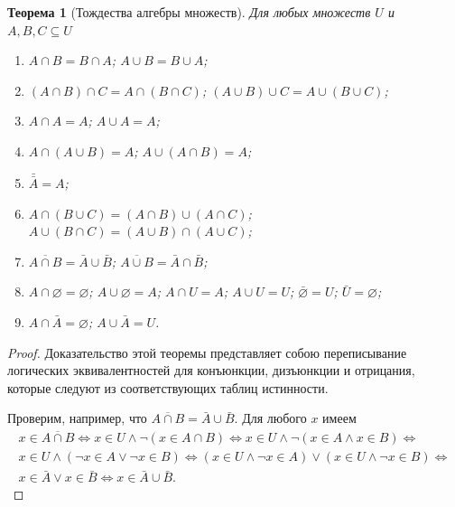 \documentclass[12pt,notitlepage]{article}
\theoremstyle{plain}
\newtheorem{thm}{Теорема}[section]
\theoremstyle{definition}
\theoremstyle{plain}
\newcommand{\sbs}{\subseteq}
\newcommand{\void}{\varnothing}
\newcommand{\1}{\mathbf{1}}
\newcommand{\0}{\mathbf{0}}
\begin{document}
\begin{thm}[Тождества алгебры множеств]\label{ch0:boolean} Для любых множеств $U$ и $A, B, C \sbs U$
	\begin{enumerate}
		\item $A \cap B = B \cap A$; $A \cup B = B \cup A$;
		\item $(A \cap B) \cap C = A \cap (B \cap C)$; $(A \cup B) \cup C = A \cup (B \cup C)$;
		\item $A \cap A = A$; $A \cup A = A$;
		\item $A \cap (A \cup B) = A$; $A \cup (A \cap B) = A$;
		\item $\bar{\bar A} = A$;
		\item $A \cap (B \cup C) = (A \cap B) \cup (A \cap C)$; $A \cup (B \cap C) = (A \cup B) \cap (A \cup C)$;
		\item $\overline{A \cap B} = \bar A \cup \bar B$; $\overline{A \cup B} = \bar A \cap \bar B$;
		\item $A \cap \void = \void$; $A \cup \void = A$; $A \cap U = A$; $A \cup U = U$; $\bar \void = U$; $\bar U = \void$;
		\item $A \cap \bar A = \void$; $A \cup \bar A = U$.
	\end{enumerate}
\end{thm}
\begin{proof}
	Доказательство этой теоремы представляет собою переписывание логических эквивалентностей для конъюнкции, дизъюнкции и отрицания, которые следуют из соответствующих таблиц истинности.
	
	Проверим, например, что $\overline{A \cap B} = \bar A \cup \bar B$. Для любого $x$ имеем
	\begin{multline*}
		x \in \overline{A \cap B} \iff x \in U \wedge \neg (x \in A \cap B) \iff x \in U \wedge \neg (x \in A \wedge x \in B) \iff\\
		x \in U \wedge (\neg x \in A \vee \neg x \in B) \iff (x \in U \wedge \neg x \in A) \vee (x \in U \wedge \neg x \in B) \iff\\
		x \in \bar A \vee x \in \bar B \iff x \in \bar A \cup \bar B.
	\end{multline*}
	
\end{proof}
\end{document}
